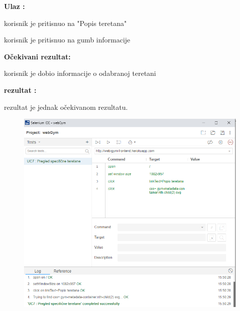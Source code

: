 				\noindent {}
                \begin{packed_item}
						\item  \textbf{Ulaz : } 
						\item[] \begin{packed_enum}
	
							\item korisnik je pritisnuo na "Popis teretana"
							
							\item korisnik je pritisnuo na gumb informacije

						\end{packed_enum}
						\item  \textbf{Očekivani rezultat: } 
						\item[] \begin{packed_enum}
	
							\item korisnik je dobio informacije o odabranoj teretani

						\end{packed_enum}
						
						\item  \textbf{rezultat : }
						\item[] \begin{packed_enum}
	
							\item rezultat je jednak očekivanom rezultatu.

						\end{packed_enum}

				\end{packed_item}
					\begin{figure}[H]
        			\hspace*{-1.5cm}
        			\includegraphics[scale=0.5]{slike/teretana.PNG} %
        			\centering
        			\label{fig:promjene}
	        	\end{figure}
	        	
